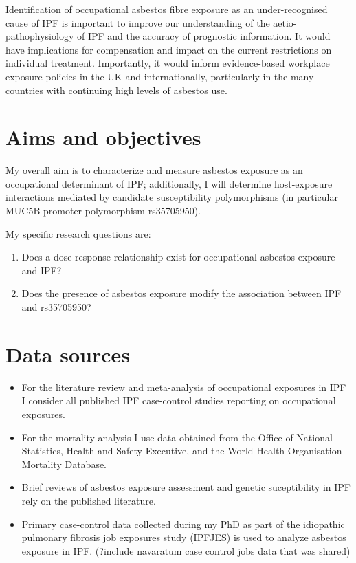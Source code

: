 \documentclass[12pt,a4paper,]{report}
\providecommand{\tightlist}{%
  \setlength{\itemsep}{0pt}\setlength{\parskip}{0pt}}
\begin{document}
Identification of occupational asbestos fibre exposure as an
under-recognised cause of IPF is important to improve our understanding
of the aetio-pathophysiology of IPF and the accuracy of prognostic
information. It would have implications for compensation and impact on
the current restrictions on individual treatment. Importantly, it would
inform evidence-based workplace exposure policies in the UK and
internationally, particularly in the many countries with continuing high
levels of asbestos use.

\hypertarget{aims-and-objectives}{%
\section{Aims and objectives}\label{aims-and-objectives}}

My overall aim is to characterize and measure asbestos exposure as an
occupational determinant of IPF; additionally, I will determine
host-exposure interactions mediated by candidate susceptibility
polymorphisms (in particular MUC5B promoter polymorphism rs35705950).

My specific research questions are:

\begin{enumerate}
\def\labelenumi{\arabic{enumi}.}
\tightlist
\item
  Does a dose-response relationship exist for occupational asbestos
  exposure and IPF?
\item
  Does the presence of asbestos exposure modify the association between
  IPF and rs35705950?
\end{enumerate}

\hypertarget{data-sources}{%
\section{Data sources}\label{data-sources}}

\begin{itemize}
\tightlist
\item
  For the literature review and meta-analysis of occupational exposures
  in IPF I consider all published IPF case-control studies reporting on
  occupational exposures.
\item
  For the mortality analysis I use data obtained from the Office of
  National Statistics, Health and Safety Executive, and the World Health
  Organisation Mortality Database.
\item
  Brief reviews of asbestos exposure assessment and genetic
  suceptibility in IPF rely on the published literature.
\item
  Primary case-control data collected during my PhD as part of the
  idiopathic pulmonary fibrosis job exposures study (IPFJES) is used to
  analyze asbestos exposure in IPF. (?include navaratum case control
  jobs data that was shared)
\end{itemize}
\end{document}
